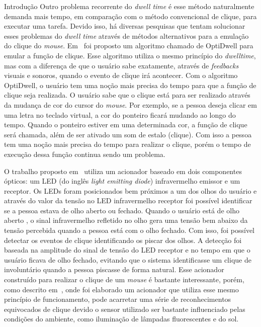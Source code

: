\begin{chapter}{Introdução}
Outro problema recorrente do \textit{dwell time} é esse método naturalmente
demanda mais tempo, em comparação com o método convencional de clique, 
para executar uma tarefa. Devido isso,
há diversas pesquisas que tentam solucionar esses problemas do \textit{dwell
time} através de métodos alternativos para a emulação do clique do
\textit{mouse}.  Em~\cite{Aanand18} foi proposto um algoritmo chamado de
OptiDwell para emular a função de clique.  Esse algoritmo utiliza o mesmo
princípio do \textit{dwelltime}, mas com a diferença de que o usuário sabe
exatamente, através de \textit{feedbacks} visuais e sonoros, quando o evento de
clique irá acontecer.  Com o algoritmo OptiDwell, o usuário tem uma noção mais
precisa do tempo para que a função de clique seja realizada. O usuário sabe que
o clique está para ser realizado através da mudança de cor do cursor do
\textit{mouse}. Por exemplo, se a pessoa deseja clicar em uma letra no teclado
virtual, a cor do ponteiro ficará mudando ao longo do tempo. Quando o ponteiro
estiver em uma determinada cor, a função de clique será chamada, além de ser
ativado um som de estalo (clique). Com isso a pessoa tem uma noção mais precisa do
tempo para realizar o clique, porém o tempo de execução dessa função continua 
sendo um problema.

O trabalho proposto em~\cite{Skim10} utiliza um acionador baseado em dois
componentes ópticos: um LED (do inglês \textit{light emitting diode}) infravermelho
emissor e um receptor. Os LEDs foram posicionados bem próximos a um dos
olhos do usuário e através do valor da tensão no LED infravermelho receptor foi
possível identificar se a pessoa estava de olho aberto ou fechado. Quando o
usuário está de olho aberto , o sinal infravermelho refletido no olho gera uma
tensão bem abaixo da tensão percebida quando a pessoa está com o olho fechado.
Com isso, foi possível detectar os eventos de clique identificando os piscar dos
olhos. A detecção foi baseada na amplitude do sinal de tensão do LED receptor e
no tempo em que o usuário ficava de olho fechado, evitando que o sistema
identificasse um clique de involuntário quando a pessoa piscasse de forma
natural. Esse acionador construído para realizar o clique de um \textit{mouse} é
bastante interessante, porém, como descrito em~\cite{Batista17}, onde foi
elaborado um acionador que utiliza esse mesmo princípio de funcionamento, pode
acarretar uma série de reconhecimentos equivocados de clique devido o sensor
utilizado ser bastante influenciado pelas condições do ambiente, como iluminação
de lâmpadas fluorescentes e do sol.


\end{chapter}

